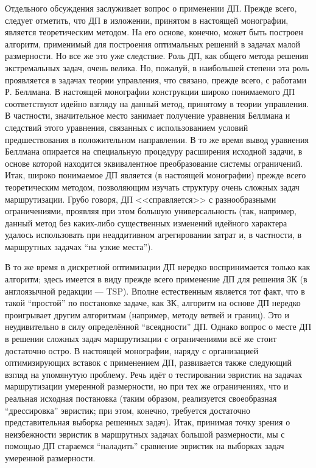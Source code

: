 \documentclass[11pt,twoside]{report}
\begin{document}
Отдельного обсуждения заслуживает вопрос о применении ДП.
Прежде всего, следует отметить, что ДП в изложении,
принятом в настоящей монографии,
является теоретическим методом.
На его основе, конечно, может быть построен алгоритм,
применимый для построения оптимальных решений
в задачах малой размерности. Но все же это уже следствие.
Роль ДП, как общего метода решения экстремальных задач,
очень велика.
Но, пожалуй, в наибольшей степени эта роль проявляется
в задачах теории управления, что связано, прежде всего,
с работами Р. Беллмана.
В настоящей монографии конструкции широко понимаемого ДП
соответствуют идейно взгляду на данный метод,
принятому в теории управления.
В частности, значительное место занимает
получение уравнения Беллмана и следствий этого уравнения,
связанных с использованием условий предшествования
в положительном направлении.
В то же время вывод уравнения Беллмана
опирается на специальную процедуру расширения исходной задачи,
в основе которой находится эквивалентное преобразование системы ограничений.
Итак, широко понимаемое ДП является (в настоящей монографии)
прежде всего теоретическим методом,
позволяющим изучать структуру очень сложных задач маршрутизации.
Грубо говоря, ДП <<справляется>> с разнообразными ограничениями,
проявляя при этом большую универсальность
(так, например, данный метод без каких-либо
существенных изменений идейного характера
удалось использовать при неаддитивном агрегировании затрат и,
в частности, в маршрутных задачах  “на узкие места”).

В то же время в дискретной оптимизации ДП
нередко воспринимается только как алгоритм;
здесь имеется в виду прежде всего применение
ДП для решения ЗК
(в англоязычной редакции — TSP).
Вполне естественным является тот факт,
что в такой “простой” по постановке задаче,
как ЗК, алгоритм на основе ДП нередко проигрывает
другим алгоритмам
(например, методу ветвей и границ).
Это и неудивительно в силу определённой “всеядности” ДП.
Однако вопрос о месте ДП в решении
сложных задач маршрутизации с ограничениями
всё же стоит достаточно остро.
В настоящей монографии, наряду с организацией оптимизирующих вставок
с применением ДП,
развивается также следующий взгляд
на упомянутую проблему.
Речь идёт о тестировании эвристик на
задачах маршрутизации умеренной размерности,
но при тех же ограничениях,
что и реальная исходная постановка
(таким образом, реализуется своеобразная
“дрессировка” эвристик; при этом,
конечно, требуется достаточно представительная выборка решенных задач).
Итак, принимая точку зрения о неизбежности эвристик
в маршрутных задачах большой размерности,
мы с помощью ДП стараемся “наладить”
сравнение эвристик на выборках задач умеренной размерности.
\end{document}
